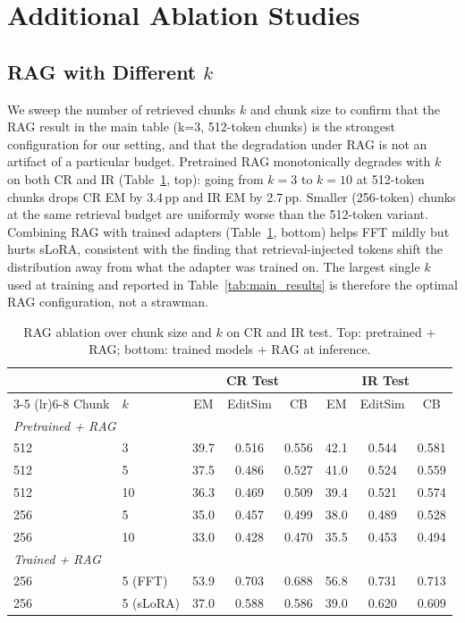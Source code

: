 \documentclass[11pt]{article}
\begin{document}
\section{Additional Ablation Studies}
\label{app:additional_results}

\subsection{RAG with Different $k$}
\label{app:rag_k}

We sweep the number of retrieved chunks $k$ and chunk size to confirm that the RAG result in the main table (k{=}3, 512-token chunks) is the strongest configuration for our setting, and that the degradation under RAG is not an artifact of a particular budget.
Pretrained RAG monotonically degrades with $k$ on both CR and IR (Table~\ref{tab:rag_k}, top): going from $k{=}3$ to $k{=}10$ at 512-token chunks drops CR EM by 3.4\,pp and IR EM by 2.7\,pp.
Smaller (256-token) chunks at the same retrieval budget are uniformly worse than the 512-token variant.
Combining RAG with trained adapters (Table~\ref{tab:rag_k}, bottom) helps FFT mildly but hurts sLoRA, consistent with the finding that retrieval-injected tokens shift the distribution away from what the adapter was trained on.
The largest single $k$ used at training and reported in Table~\ref{tab:main_results} is therefore the optimal RAG configuration, not a strawman.

\begin{table}[t]
\begin{small}
\begin{center}
\caption{RAG ablation over chunk size and $k$ on CR and IR test. Top: pretrained + RAG; bottom: trained models + RAG at inference.}\label{tab:rag_k}

\begin{tabular}{llccc@{\hskip 12pt}ccc}
\toprule
& & \multicolumn{3}{c}{CR Test} & \multicolumn{3}{c}{IR Test} \\
\cmidrule(lr){3-5} \cmidrule(lr){6-8}
Chunk & $k$ & EM & EditSim & CB & EM & EditSim & CB \\
\midrule
\multicolumn{8}{l}{\emph{Pretrained + RAG}} \\
\midrule
512 & 3 & 39.7 & 0.516 & 0.556 & 42.1 & 0.544 & 0.581 \\
512 & 5 & 37.5 & 0.486 & 0.527 & 41.0 & 0.524 & 0.559 \\
512 & 10 & 36.3 & 0.469 & 0.509 & 39.4 & 0.521 & 0.574 \\
256 & 5 & 35.0 & 0.457 & 0.499 & 38.0 & 0.489 & 0.528 \\
256 & 10 & 33.0 & 0.428 & 0.470 & 35.5 & 0.453 & 0.494 \\
\midrule
\multicolumn{8}{l}{\emph{Trained + RAG}} \\
\midrule
256 & 5 (FFT) & 53.9 & 0.703 & 0.688 & 56.8 & 0.731 & 0.713 \\
256 & 5 (sLoRA) & 37.0 & 0.588 & 0.586 & 39.0 & 0.620 & 0.609 \\
\bottomrule
\end{tabular}


\end{center}
\end{small}
\end{table}
\end{document}
